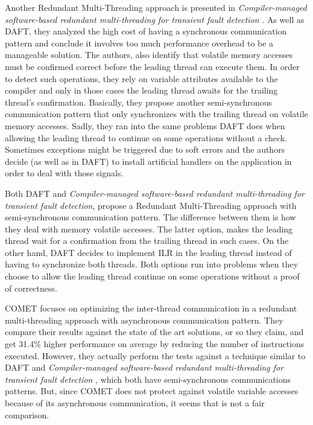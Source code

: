 Another Redundant Multi-Threading approach is presented in \textit{Compiler-managed software-based redundant multi-threading for transient fault detection} \cite{wang2007compiler}. As well as DAFT, they analyzed the high cost of having a synchronous communication pattern and conclude it involves too much performance overhead to be a manageable solution. The authors, also identify that volatile memory accesses must be confirmed correct before the leading thread can execute them. In order to detect such operations, they rely on variable attributes available to the compiler and only in those cases the leading thread awaits for the trailing thread's confirmation. Basically, they propose another semi-synchronous communication pattern that only synchronizes with the trailing thread on volatile memory accesses. Sadly, they ran into the same problems DAFT does when allowing the leading thread to continue on some operations without a check. Sometimes exceptions might be triggered due to soft errors and the authors decide (as well as in DAFT) to install artificial handlers on the application in order to deal with those signals. 

Both DAFT and \textit{Compiler-managed software-based redundant multi-threading for transient fault detection}, propose a Redundant Multi-Threading approach with semi-synchronous communication pattern. The difference between them is how they deal with memory volatile accesses. The latter option, makes the leading thread wait for a confirmation from the trailing thread in such cases. On the other hand, DAFT decides to implement ILR in the leading thread instead of having to synchronize both threads. Both options run into problems when they choose to allow the leading thread continue on some operations without a proof of correctness. 

COMET \cite{mitropoulou2016comet} focuses on optimizing the inter-thread communication in a redundant multi-threading approach with asynchronous communication pattern. They compare their results against the state of the art solutions, or so they claim, and get 31.4\% higher performance on average by reducing the number of instructions executed. However, they actually perform the tests against a technique similar to DAFT \cite{zhang2012daft} and \textit{Compiler-managed software-based redundant multi-threading for transient fault detection} \cite{wang2007compiler}, which both have semi-synchronous communications patterns. But, since COMET does not protect against volatile variable accesses because of its asynchronous communication, it seems that is not a fair comparison. 

